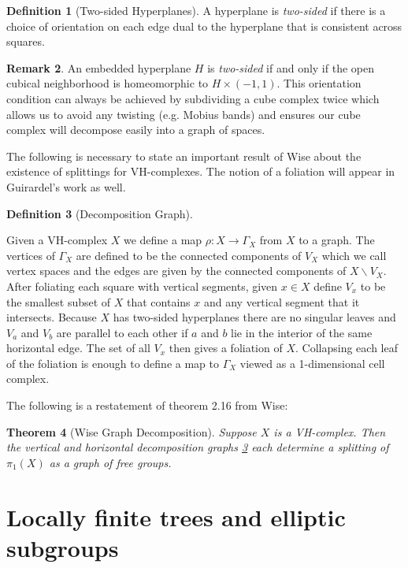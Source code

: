 \documentclass[12pt,parskip=full]{report}
\theoremstyle{plain}
\newtheorem{thm}{Theorem}[section]
\theoremstyle{definition}
\newtheorem{rmk}[thm]{Remark}
\newtheorem{dfn}[thm]{Definition}
\begin{document}
\begin{dfn}
    [Two-sided Hyperplanes]
    A hyperplane is \emph{two-sided} if there is a choice of orientation on each edge dual to the hyperplane that is consistent across squares.
\end{dfn}

\begin{rmk}
    An embedded hyperplane \(H\) is \emph{two-sided} if and only if the open cubical neighborhood is homeomorphic to \(H\times (-1,1)\). This orientation condition can always be achieved by subdividing a cube complex twice which allows us to avoid any twisting (e.g. Mobius bands) and ensures our cube complex will decompose easily into a graph of spaces.
\end{rmk}

The following is necessary to state an important result of Wise about the existence of splittings for VH-complexes. The notion of a  foliation will appear in Guirardel's work as well.
\begin{dfn}
    [Decomposition Graph]
    \label{dfn:decompositiongraph}
    
    Given a VH-complex \(X\) we define a map \(\rho: X\to \Gamma_X\) from \(X\) to a graph. The vertices of \(\Gamma_X\) are defined to be the connected components of \(V_X\) which we call vertex spaces and the edges are given by the connected components of \(X\smallsetminus V_X\). After foliating each square with vertical segments, given \(x\in X\) define \(V_x\) to be the smallest subset of \(X\) that contains \(x\) and any vertical segment that it intersects. Because \(X\) has two-sided hyperplanes there are no singular leaves and \(V_a\) and \(V_b\) are parallel to each other if \(a\) and \(b\) lie in the interior of the same horizontal edge. The set of all \(V_x\) then gives a foliation of \(X\). Collapsing each leaf of the foliation is enough to define a map to \(\Gamma_X\) viewed as a 1-dimensional cell complex. 
\end{dfn}

The following is a restatement of theorem 2.16 \cite{wisethesis} from Wise:
\begin{thm}[Wise Graph Decomposition]
\label{thm:wisegraph}
Suppose \(X\) is a VH-complex. Then the vertical and horizontal decomposition graphs \ref{dfn:decompositiongraph} each determine a splitting of \(\pi_1(X)\) as a graph of free groups. 
\end{thm}

\chapter{Locally finite trees and elliptic subgroups}
\end{document}
